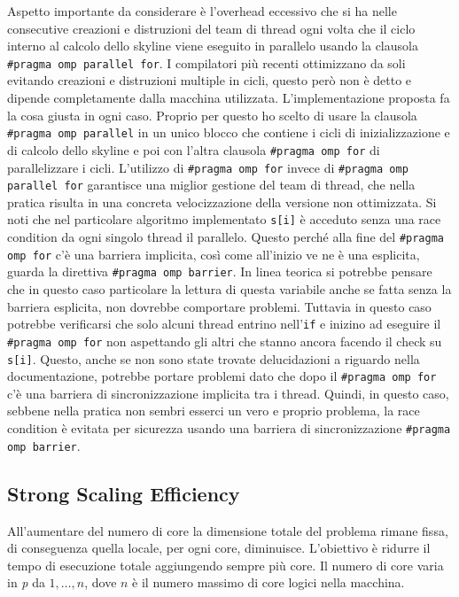 \documentclass[11pt, a4paper]{article}
\begin{document}
Aspetto importante da considerare è l'overhead eccessivo che si ha nelle consecutive creazioni e distruzioni del team di
thread ogni volta che il ciclo interno al calcolo dello skyline viene eseguito in parallelo usando la clausola
\texttt{\#pragma omp parallel for}.
I compilatori più recenti ottimizzano da soli evitando creazioni e distruzioni multiple in cicli, questo però non è detto e
dipende completamente dalla macchina utilizzata.
L'implementazione proposta fa la cosa giusta in ogni caso.
Proprio per questo ho scelto di usare la clausola \texttt{\#pragma omp parallel} in un unico blocco che contiene i cicli di
inizializzazione e di calcolo dello skyline e poi con l'altra clausola \texttt{\#pragma omp for} di parallelizzare i cicli.
L'utilizzo di \texttt{\#pragma omp for} invece di \texttt{\#pragma omp parallel for} garantisce una miglior gestione del team di
thread, che nella pratica risulta in una concreta velocizzazione della versione non ottimizzata.
Si noti che nel particolare algoritmo implementato \texttt{s[i]} è acceduto senza una race condition da ogni singolo thread
il parallelo.
Questo perché alla fine del \texttt{\#pragma omp for} c'è una barriera implicita, così come all'inizio ve ne è una esplicita,
guarda la direttiva \texttt{\#pragma omp barrier}.
In linea teorica si potrebbe pensare che in questo caso particolare la lettura di questa variabile anche se fatta senza la
barriera esplicita, non dovrebbe comportare problemi.
Tuttavia in questo caso potrebbe verificarsi che solo alcuni thread entrino nell'\texttt{if} e inizino ad eseguire il
\texttt{\#pragma omp for} non aspettando gli altri che stanno ancora facendo il check su \texttt{s[i]}.
Questo, anche se non sono state trovate delucidazioni a riguardo nella documentazione, potrebbe portare problemi dato che dopo il
\texttt{\#pragma omp for} c'è una barriera di sincronizzazione implicita tra i thread.
Quindi, in questo caso, sebbene nella pratica non sembri esserci un vero e proprio problema, la race condition è evitata per
sicurezza usando una barriera di sincronizzazione \texttt{\#pragma omp barrier}.

\subsection{Strong Scaling Efficiency}

All'aumentare del numero di core la dimensione totale del problema rimane fissa, di conseguenza quella locale, per ogni core,
diminuisce.
L'obiettivo è ridurre il tempo di esecuzione totale aggiungendo sempre più core.
Il numero di core varia in \textit{p} da \({1, \dots, n}\), dove \(n\) è il numero massimo di core logici nella macchina.
\end{document}
